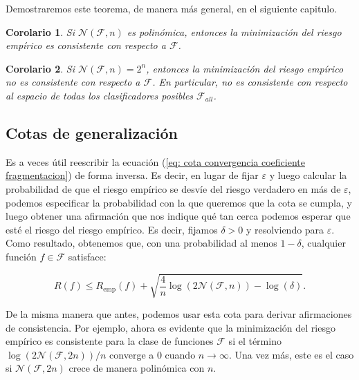 \documentclass{report}
\newtheorem{cor}{Corolario}[thm]
\begin{document}
Demostraremos este teorema, de manera más general, en el siguiente capitulo.

\begin{cor}
    Si $\mathcal{N}(\mathcal{F}, n)$ es polinómica, entonces la minimización del riesgo empírico es consistente con respecto a $\mathcal{F}$.\\
\end{cor}
\begin{cor}
    Si $\mathcal{N}(\mathcal{F}, n)=2^n$, entonces la minimización del riesgo empírico no es consistente con respecto a $\mathcal{F}$. En 
    particular, no es consistente con respecto al espacio de todas los clasificadores posibles $\mathcal{F}_{all}$.
\end{cor}

\subsection{Cotas de generalización}

Es a veces útil reescribir la ecuación (\ref{eq: cota convergencia coeficiente fragmentacion}) de forma inversa. Es decir, en lugar de 
fijar \(\varepsilon\) y 
luego calcular la probabilidad de que el riesgo empírico se desvíe del riesgo verdadero en más de \(\varepsilon\), 
podemos especificar la probabilidad con la que queremos que la cota se cumpla, y luego obtener una afirmación 
que nos indique qué tan cerca podemos esperar que esté el riesgo del riesgo empírico. Es decir, fijamos \(\delta > 0\) 
y resolviendo para \(\varepsilon\). Como resultado, obtenemos que, con una probabilidad al menos \(1 - \delta\), cualquier 
función \(f \in \mathcal{F}\) satisface:

\begin{equation}
    R(f) \leq R_{\text{emp}}(f) + \sqrt{\frac{4}{n} \log(2\mathcal{N}(\mathcal{F}, n)) - \log(\delta)}. \label{eq: cota generalizacion}
\end{equation}
\newline

De la misma manera que antes, podemos usar esta cota para derivar afirmaciones de consistencia. Por ejemplo, 
ahora es evidente que la minimización del riesgo empírico es consistente para la clase de funciones \(\mathcal{F}\) 
si el término \(\log(2\mathcal{N}(\mathcal{F}, 2n))/n\) converge a \(0\) cuando \(n \to \infty\). Una vez más, 
este es el caso si \(\mathcal{N}(\mathcal{F}, 2n)\) crece de manera polinómica con \(n\).\newline
\end{document}
